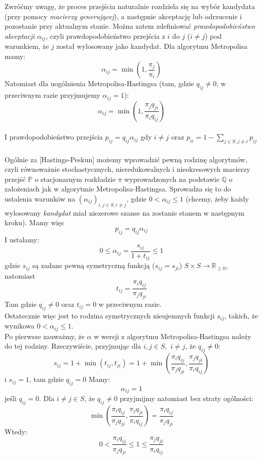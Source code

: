 \documentclass[a4paper]{article}
\begin{document}
Zwróćmy uwagę, że proces przejścia naturalnie rozdziela się na wybór kandydata (przy pomocy \textit{macierzy generującej}), a następnie akceptację lub odrzucenie i pozostanie przy aktualnym stanie. Można zatem zdefiniować \textit{prawdopodobieństwo akceptacji} $\alpha_{ij}$, czyli prawdopodobieństwo przejścia z $i$ do $j$ ($i \neq j$) pod warunkiem, że $j$ został wylosowany jako kandydat. Dla algorytmu Metropolisa mamy:
$$\alpha_{ij} = \min(1, \frac{\pi_j}{\pi_i})$$
Natomiast dla uogólnienia Metropolisa-Hastingsa (tam, gdzie $q_{ij} \neq 0$, w przeciwnym razie przyjmujemy $\alpha_{ij} = 1$):
$$\alpha_{ij} = \min(1, \frac{\pi_j q_{ji}}{\pi_i q_{ij}})$$
\\
I prawdopodobieństwo przejścia $p_{ij} = q_{ij}\alpha_{ij}$ gdy $i \neq j$ oraz $p_{ii} = 1 - \sum\limits_{j \in S, j \neq i} p_{ij}$\\\\
Ogólnie za [Hastings-Peskun] możemy wprowadzić pewną rodzinę algorytmów, czyli równoważnie stochastycznych, nieredukowalnych i nieokresowych macierzy przejść $\mathbb{P}$ o stacjonarnym rozkładzie $\pi$ wyprowadzonych na podstawie $\mathbb{Q}$ o założeniach jak w algorytmie Metropolisa-Hastingsa. Sprowadza się to do ustalenia warunków na $(\alpha_{ij})_{i,j \in S, i \neq j}$, gdzie $0 < \alpha_{ij} \leq 1$ (chcemy, żeby każdy wylosowany \textit{kandydat} miał niezerowe szanse na zostanie stanem w następnym kroku). Mamy więc  $$p_{ij} = q_{ij}\alpha_{ij}$$
I ustalamy:
$$ 0 \leq \alpha_{ij} = \frac{s_{ij}}{1+t_{ij}} \leq 1$$
gdzie  $s_{ij}$ są zadane pewną symetryczną funkcją ($s_{ij} = s_{ji}$) $S \times S \to \mathbb{R}_{\geq 0}$, natomiast $$t_{ij} = \frac{\pi_i q_{ij}}{\pi_j q_{ji}}$$
Tam gdzie $q_{ij} \neq 0$ oraz $t_{ij} = 0$ w przeciwnym razie.\\
Ostatecznie więc jest to rodzina symetrycznych nieujemnych funkcji $s_{ij}$, takich, że wynikowa $0 < \alpha_{ij} \leq 1$.\\
Po pierwsze zauważmy, że $\alpha$ w wersji z algorytmu Metropolisa-Hastingsa należy do tej rodziny. Rzeczywiście, przyjmując dla $i,j \in S,\,\, i \neq j$, że $q_{ij} \neq 0$:
$$s_{ij} = 1 + \min(t_{ij}, t_{ji}) = 1 + \min\left(\frac{\pi_i q_{ij}}{\pi_j q_{ji}}, \frac{\pi_j q_{ji}}{\pi_i q_{ij}}\right)$$
i $s_{ij} = 1$, tam gdzie $q_{ij} = 0$
Mamy:
$$\alpha_{ij} = 1$$
jeśli $q_{ij} = 0$. Dla $i \neq j \in S$, że $q_{ij} \neq 0$ przyjmijmy natomiast bez straty ogólności:
$$\min\left(\frac{\pi_i q_{ij}}{\pi_j q_{ji}}, \frac{\pi_j q_{ji}}{\pi_i q_{ij}}\right) = \frac{\pi_i q_{ij}}{\pi_j q_{ji}}$$
Wtedy:
$$0 < \frac{\pi_i q_{ij}}{\pi_j q_{ji}} \leq 1 \leq \frac{\pi_j q_{ji}}{\pi_i q_{ij}}$$
\end{document}
